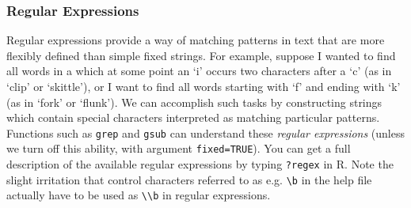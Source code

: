 \documentclass[10pt] {article}
\theoremstyle{definition}
\begin{document}
\subsubsection{Regular Expressions}

Regular expressions provide a way of matching patterns in text that are more flexibly defined than simple fixed strings. For example, suppose I wanted to find all words in a which at some point an `i' occurs two characters after a `c' (as in `clip' or `skittle'), or I want to find all words starting with `f' and ending with `k' (as in `fork' or `flunk'). We can accomplish such tasks by constructing strings which contain special characters interpreted as matching particular patterns. Functions such as {\tt grep} and {\tt gsub} can understand these {\em regular expressions} (unless we turn off this ability, with argument \lstinline+fixed=TRUE+). You can get a full description of the available regular expressions by typing \lstinline+?regex+ in R.  Note the slight irritation that control characters referred to as e.g. \verb+\b+ in the help file actually have to be used as \verb+\\b+ in regular expressions.
\end{document}
